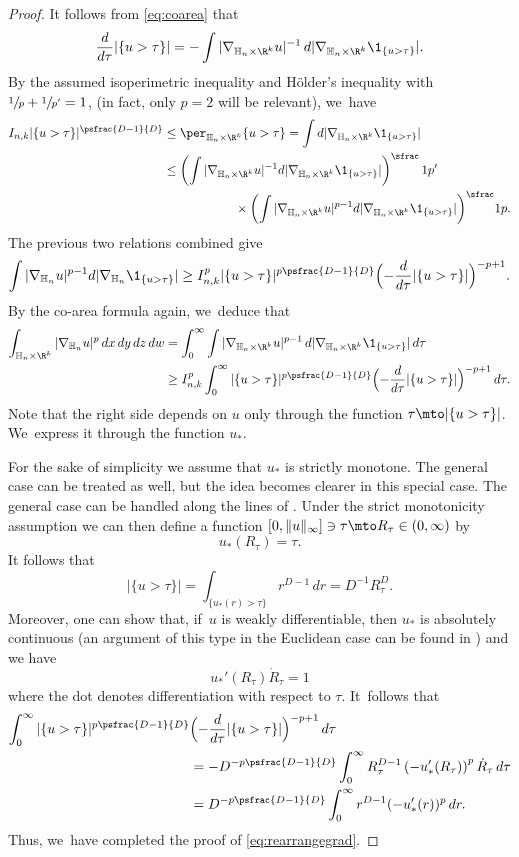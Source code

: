 \begin{proof}
It follows from \eqref{eq:coarea} that
\[
\frac{d}{d\tau}|\{ u>\tau\}| = - \int |\nabla_{\mathbb H_n\times\R^k} u|^{-1} \,d|\nabla_{\mathbb H_n\times\R^k}\1_{\{u>\tau\}}|.
\]
By the assumed isoperimetric inequality and Hölder's inequality with \hbox{$\sfrac1p + \sfrac1{p'}=1$}, (in fact, only $p=2$ will be relevant), we~have
\begin{align*}
I_{n,k} |\{ u>\tau\}|^\psfrac{D-1}{D} & \leq \per_{\mathbb H_n\times\R^k} \{u>\tau\}
= \int d|\nabla_{\mathbb H_n\times\R^k}\1_{\{u>\tau\}}| \\
& \leq \left(\int |\nabla_{\mathbb H_n\times\R^k} u|^{-1} d|\nabla_{\mathbb H_n\times\R^k}\1_{\{u>\tau\}}|\right)^\sfrac1{p'} \\
& \hspace*{2cm} \times \biggl(\int |\nabla_{\mathbb H_n\times\R^k} u|^{p-1} d|\nabla_{\mathbb H_n\times\R^k}\1_{\{u>\tau\}}|\biggr)^\sfrac 1p.
\end{align*}
The previous two relations combined give
\[
\int |\nabla_{\mathbb H_n} u|^{p-1} d|\nabla_{\mathbb H_n}\1_{\{u>\tau\}}| \geq I_{n,k}^p |\{ u>\tau\}|^{p\psfrac{D-1}{D}} \Bigl(- \frac{d}{d\tau} |\{ u>\tau\}|\Bigr)^{-p+1}.
\]
By the co-area formula again, we~deduce that
\begin{align*}
\int_{\mathbb H_n\times\R^k} |\nabla_{\mathbb H_n} u|^p \,dx\,dy\,dz\,dw & = \int_0^\infty \int |\nabla_{\mathbb H_n\times\R^k} u|^{p-1} \,d|\nabla_{\mathbb H_n\times\R^k}\1_{\{u>\tau\}}| \,d\tau \\
& \geq I_{n,k}^p \int_0^\infty |\{ u>\tau\}|^{p\psfrac{D-1}{D}} \Bigl(- \frac{d}{d\tau} |\{ u>\tau\}|\Bigr)^{-p+1}\,d\tau.
\end{align*}
Note that the right side depends on $u$ only through the function $\tau\mto|\{ u>\tau\}|$. We~express it through the function $u_*$.

For the sake of simplicity we assume that $u_*$ is strictly monotone. The general case can be treated as well, but the idea becomes clearer in this special case. The general case can be handled along the lines of \cite[Th.\,15.29]{Leo}. Under the strict monotonicity assumption we can then define a function $[0,\|u\|_\infty]\ni\tau \mto R_\tau\in (0,\infty)$ by
\[
u_*(R_\tau) = \tau.
\]
It follows that
\[
|\{ u>\tau \}| = \int_{\{u_*(r)>\tau\}} r^{D-1}\,dr = D^{-1} R_\tau^D.
\]
Moreover, one can show that, if~$u$ is weakly differentiable, then $u_*$ is absolutely continuous (an argument of this type in the Euclidean case can be found in \cite[Th.\,15.23]{Leo}) and we have
\[
u_*'(R_\tau) \dot R_\tau = 1
\]
where the dot denotes differentiation with respect to $\tau$. It~follows that
\begin{align*}
\int_0^\infty |\{ u>\tau\}|^{p\psfrac{D-1}{D}}& \Bigl(- \frac{d}{d\tau} |\{ u>\tau\}|\Bigr)^{-p+1}\,d\tau \\
& = - D^{-p\psfrac{D-1}{D}} \int_0^\infty R_\tau^{D-1} \left(- u_*'(R_\tau)\right)^p \dot R_\tau \,d\tau \\
& = D^{-p\psfrac{D-1}{D}} \int_0^\infty r^{D-1} (-u_*'(r))^p\,dr.
\end{align*}
Thus, we~have completed the proof of \eqref{eq:rearrangegrad}.


\end{proof}
